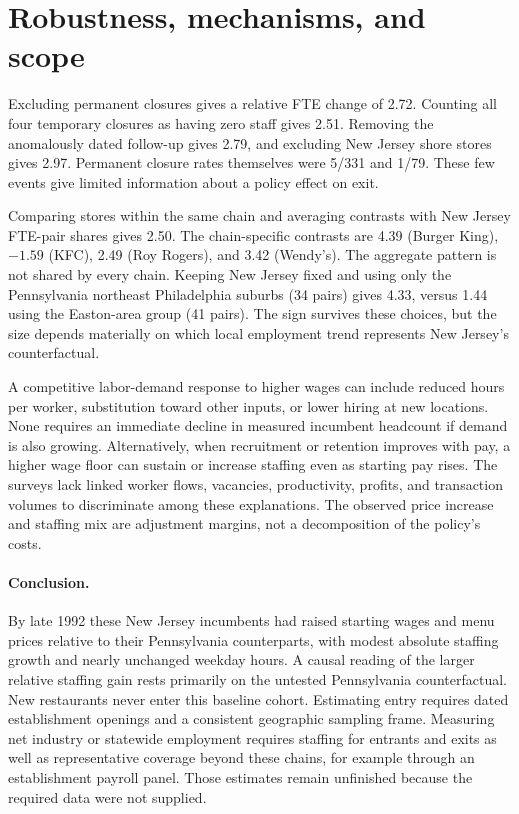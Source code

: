 \documentclass[11pt]{article}
\begin{document}
\section{Robustness, mechanisms, and scope}
Excluding permanent closures gives a relative FTE change of 2.72.
Counting all four temporary closures as having zero staff gives 2.51.
Removing the anomalously dated follow-up gives 2.79, and excluding
New Jersey shore stores gives 2.97. Permanent closure rates themselves
were 5/331 and 1/79. These few events give limited information about
a policy effect on exit.

Comparing stores within the same chain and averaging contrasts with New
Jersey FTE-pair shares gives 2.50. The chain-specific contrasts are
4.39 (Burger King), $-1.59$ (KFC), 2.49 (Roy Rogers), and 3.42
(Wendy's). The aggregate pattern is not shared by every chain.
Keeping New Jersey fixed and using only the Pennsylvania northeast
Philadelphia suburbs (34 pairs) gives 4.33, versus 1.44 using the
Easton-area group (41 pairs). The sign survives these choices, but
the size depends materially on which local employment trend represents
New Jersey's counterfactual.

A competitive labor-demand response to higher wages can include reduced
hours per worker, substitution toward other inputs, or lower hiring at
new locations. None requires an immediate decline in measured incumbent
headcount if demand is also growing. Alternatively, when recruitment or
retention improves with pay, a higher wage floor can sustain or increase
staffing even as starting pay rises. The surveys lack linked worker flows,
vacancies, productivity, profits, and transaction volumes to discriminate
among these explanations. The observed price increase and staffing mix
are adjustment margins, not a decomposition of the policy's costs.

\paragraph{Conclusion.}
By late 1992 these New Jersey incumbents had raised starting wages and
menu prices relative to their Pennsylvania counterparts, with modest
absolute staffing growth and nearly unchanged weekday hours. A causal
reading of the larger relative staffing gain rests primarily on the
untested Pennsylvania counterfactual. New restaurants never enter this
baseline cohort. Estimating entry requires dated establishment openings
and a consistent geographic sampling frame. Measuring net industry or
statewide employment requires staffing for entrants and exits as well
as representative coverage beyond these chains, for example through an
establishment payroll panel. Those estimates remain unfinished because
the required data were not supplied.
\end{document}
